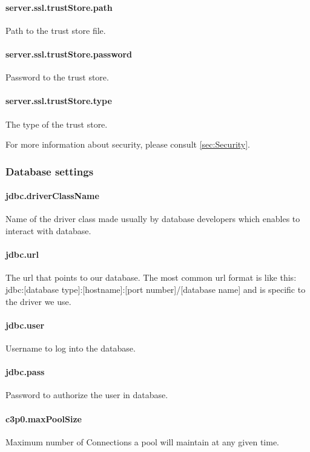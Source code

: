 \paragraph{server.ssl.trustStore.path}
Path to the trust store file.

\paragraph{server.ssl.trustStore.password}
Password to the trust store.

\paragraph{server.ssl.trustStore.type}
The type of the trust store.

\vspace{0.75cm}
For more information about security, please consult \ref{sec:Security}.

\subsubsection{Database settings}
\label{sssec:DataSettings}

\paragraph{jdbc.driverClassName}
Name of the driver class made usually by database developers which enables to interact with database.

\paragraph{jdbc.url}
 The url that points to our database. The most common url format is like this:
jdbc:[database type]:[hostname]:[port number]/[database name]
and is specific to the driver we use.

\paragraph{jdbc.user}
Username to log into the database.
\paragraph{jdbc.pass}
Password to authorize the user in database.

\paragraph{c3p0.maxPoolSize}
Maximum number of Connections a pool will maintain at any given time.


